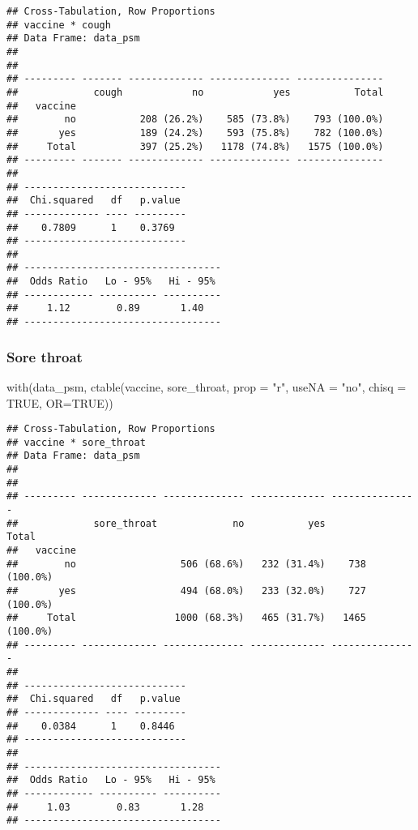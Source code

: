 \documentclass[
]{article}
\newenvironment{Shaded}{\begin{snugshade}}{\end{snugshade}}
\newcommand{\AttributeTok}[1]{\textcolor[rgb]{0.77,0.63,0.00}{#1}}
\newcommand{\ConstantTok}[1]{\textcolor[rgb]{0.00,0.00,0.00}{#1}}
\newcommand{\FunctionTok}[1]{\textcolor[rgb]{0.00,0.00,0.00}{#1}}
\newcommand{\NormalTok}[1]{#1}
\newcommand{\StringTok}[1]{\textcolor[rgb]{0.31,0.60,0.02}{#1}}
\begin{document}
\begin{verbatim}
## Cross-Tabulation, Row Proportions  
## vaccine * cough  
## Data Frame: data_psm  
## 
## 
## --------- ------- ------------- -------------- ---------------
##             cough            no            yes           Total
##   vaccine                                                     
##        no           208 (26.2%)    585 (73.8%)    793 (100.0%)
##       yes           189 (24.2%)    593 (75.8%)    782 (100.0%)
##     Total           397 (25.2%)   1178 (74.8%)   1575 (100.0%)
## --------- ------- ------------- -------------- ---------------
## 
## ----------------------------
##  Chi.squared   df   p.value 
## ------------- ---- ---------
##    0.7809      1    0.3769  
## ----------------------------
## 
## ----------------------------------
##  Odds Ratio   Lo - 95%   Hi - 95% 
## ------------ ---------- ----------
##     1.12        0.89       1.40   
## ----------------------------------
\end{verbatim}

\hypertarget{sore-throat-1}{%
\subsubsection{Sore throat}\label{sore-throat-1}}

\begin{Shaded}
\begin{Highlighting}[]
\FunctionTok{with}\NormalTok{(data\_psm, }\FunctionTok{ctable}\NormalTok{(vaccine, sore\_throat, }\AttributeTok{prop =} \StringTok{"r"}\NormalTok{, }\AttributeTok{useNA =} \StringTok{"no"}\NormalTok{, }\AttributeTok{chisq =} \ConstantTok{TRUE}\NormalTok{, }\AttributeTok{OR=}\ConstantTok{TRUE}\NormalTok{))}
\end{Highlighting}
\end{Shaded}

\begin{verbatim}
## Cross-Tabulation, Row Proportions  
## vaccine * sore_throat  
## Data Frame: data_psm  
## 
## 
## --------- ------------- -------------- ------------- ---------------
##             sore_throat             no           yes           Total
##   vaccine                                                           
##        no                  506 (68.6%)   232 (31.4%)    738 (100.0%)
##       yes                  494 (68.0%)   233 (32.0%)    727 (100.0%)
##     Total                 1000 (68.3%)   465 (31.7%)   1465 (100.0%)
## --------- ------------- -------------- ------------- ---------------
## 
## ----------------------------
##  Chi.squared   df   p.value 
## ------------- ---- ---------
##    0.0384      1    0.8446  
## ----------------------------
## 
## ----------------------------------
##  Odds Ratio   Lo - 95%   Hi - 95% 
## ------------ ---------- ----------
##     1.03        0.83       1.28   
## ----------------------------------
\end{verbatim}
\end{document}
